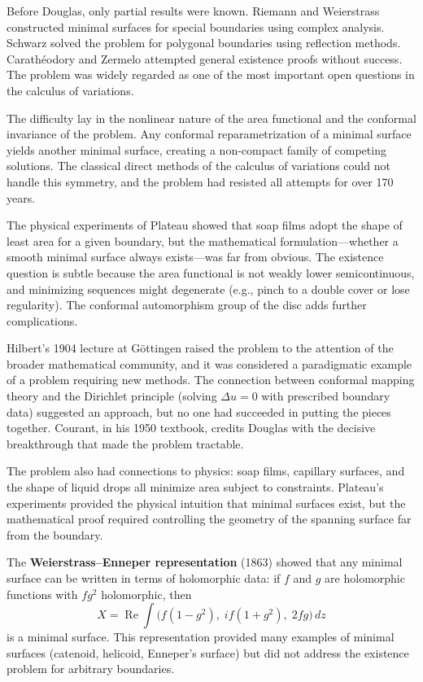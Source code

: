Before Douglas, only partial results were known. Riemann and Weierstrass
constructed minimal surfaces for special boundaries using complex
analysis. Schwarz solved the problem for polygonal boundaries using
reflection methods. Carath\'eodory and Zermelo attempted general
existence proofs without success. The problem was widely regarded as one
of the most important open questions in the calculus of variations.

The difficulty lay in the nonlinear nature of the area functional and the
conformal invariance of the problem. Any conformal reparametrization of
a minimal surface yields another minimal surface, creating a non-compact
family of competing solutions. The classical direct methods of the
calculus of variations could not handle this symmetry, and the problem
had resisted all attempts for over 170 years.

The physical experiments of Plateau showed that soap films adopt the
shape of least area for a given boundary, but the mathematical
formulation---whether a smooth minimal surface always exists---was far
from obvious. The existence question is subtle because the area
functional is not weakly lower semicontinuous, and minimizing sequences
might degenerate (e.g., pinch to a double cover or lose regularity). The
conformal automorphism group of the disc adds further complications.

Hilbert's 1904 lecture at G\"{o}ttingen raised the problem to the
attention of the broader mathematical community, and it was considered a
paradigmatic example of a problem requiring new methods. The connection
between conformal mapping theory and the Dirichlet principle (solving
$\Delta u = 0$ with prescribed boundary data) suggested an approach, but
no one had succeeded in putting the pieces together. Courant, in his
1950 textbook, credits Douglas with the decisive breakthrough that made
the problem tractable.

The problem also had connections to physics: soap films, capillary
surfaces, and the shape of liquid drops all minimize area subject to
constraints. Plateau's experiments provided the physical intuition that
minimal surfaces exist, but the mathematical proof required controlling
the geometry of the spanning surface far from the boundary.

The \textbf{Weierstrass--Enneper representation} (1863) showed that any
minimal surface can be written in terms of holomorphic data: if $f$ and
$g$ are holomorphic functions with $fg^2$ holomorphic, then
\[
X = \operatorname{Re} \int \bigl(f(1-g^2),\; if(1+g^2),\; 2fg\bigr) \, dz
\]
is a minimal surface. This representation provided many examples of
minimal surfaces (catenoid, helicoid, Enneper's surface) but did not
address the existence problem for arbitrary boundaries.

